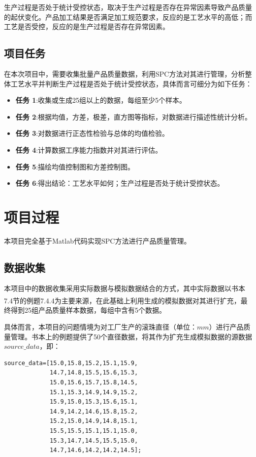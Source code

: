 \documentclass[12pt]{article}  %
\newcommand{\upcite}[1]{\textsuperscript{\textsuperscript{\cite{#1}}}}
\begin{document}
生产过程是否处于统计受控状态，取决于生产过程是否存在异常因素导致产品质量的起伏变化。产品加工结果是否满足加工规范要求，反应的是工艺水平的高低；而工艺是否受控，反应的是生产过程是否存在异常因素。

\subsection{项目任务}	
在本次项目中，需要收集批量产品质量数据，利用SPC方法对其进行管理，分析整体工艺水平并判断生产过程是否处于统计受控状态，具体而言可细分为如下任务：
\begin{itemize}
	\setlength{\parsep}{0ex} %
	\setlength{\topsep}{2ex} %
	\setlength{\itemsep}{1ex} %
	\item \textbf{任务 1}:收集或生成25组以上的数据，每组至少5个样本。		
	\item \textbf{任务 2}:根据均值，方差，极差，直方图等指标，对数据进行描述性统计分析。
	\item \textbf{任务 3}:对数据进行正态性检验与总体的均值检验。
	\item \textbf{任务 4}:计算数据工序能力指数并对其进行评估。
	\item \textbf{任务 5}:描绘均值控制图和方差控制图。
	\item \textbf{任务 6}:得出结论：工艺水平如何；生产过程是否处于统计受控状态。
\end{itemize}

\section{项目过程}
本项目完全基于Matlab代码实现SPC方法进行产品质量管理。
\subsection{数据收集}
本项目中的数据收集采用实际数据与模拟数据结合的方式，其中实际数据以书本7.4节的例题7.4.4\upcite{1}为主要来源，在此基础上利用生成的模拟数据对其进行扩充，最终得到25组产品质量样本数据，每组中含有5个数据。

具体而言，本项目的问题情境为对工厂生产的滚珠直径（单位：$mm$）进行产品质量管理。书本上的例题提供了50个直径数据，将其作为扩充生成模拟数据的源数据$source\_data$，即：
\begin{lstlisting}
source_data=[15.0,15.8,15.2,15.1,15.9,
			 14.7,14.8,15.5,15.6,15.3,
			 15.0,15.6,15.7,15.8,14.5,
			 15.1,15.3,14.9,14.9,15.2,
			 15.9,15.0,15.3,15.6,15.1,
			 14.9,14.2,14.6,15.8,15.2,
			 15.2,15.0,14.9,14.8,15.1,
			 15.5,15.5,15.1,15.1,15.0,
			 15.3,14.7,14.5,15.5,15.0,
			 14.7,14.6,14.2,14.2,14.5]; 
\end{lstlisting}
\end{document}
